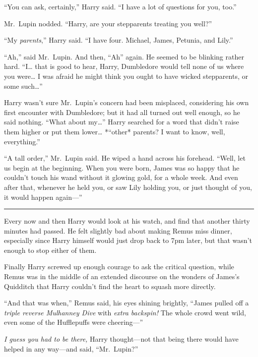 ``You can ask, certainly,'' Harry said. ``I have a lot of questions for
you, too.''

Mr.~Lupin nodded. ``Harry, are your stepparents treating you well?''

``My \emph{parents},'' Harry said. ``I have four. Michael, James,
Petunia, and Lily.''

``Ah,'' said Mr.~Lupin. And then, ``Ah'' again. He seemed to be blinking
rather hard. ``I\ldots{} that is good to hear, Harry, Dumbledore would
tell none of us where you were\ldots{} I was afraid he might think you
ought to have wicked stepparents, or some such\ldots{}''

Harry wasn't sure Mr.~Lupin's concern had been misplaced, considering
his own first encounter with Dumbledore; but it had all turned out well
enough, so he said nothing. ``What about my\ldots{}'' Harry searched for
a word that didn't raise them higher or put them lower\ldots{} *``other*
parents? I want to know, well, everything.''

``A tall order,'' Mr.~Lupin said. He wiped a hand across his forehead.
``Well, let us begin at the beginning. When you were born, James was so
happy that he couldn't touch his wand without it glowing gold, for a
whole week. And even after that, whenever he held you, or saw Lily
holding you, or just thought of you, it would happen again---''

\begin{center}\rule{3in}{0.4pt}\end{center}

Every now and then Harry would look at his watch, and find that another
thirty minutes had passed. He felt slightly bad about making Remus miss
dinner, especially since Harry himself would just drop back to 7pm
later, but that wasn't enough to stop either of them.

Finally Harry screwed up enough courage to ask the critical question,
while Remus was in the middle of an extended discourse on the wonders of
James's Quidditch that Harry couldn't find the heart to squash more
directly.

``And that was when,'' Remus said, his eyes shining brightly, ``James
pulled off a \emph{triple reverse Mulhanney Dive} with \emph{extra
backspin!} The whole crowd went wild, even some of the Hufflepuffs were
cheering---''

\emph{I guess you had to be there,} Harry thought---not that being there
would have helped in any way---and said, ``Mr.~Lupin?''

